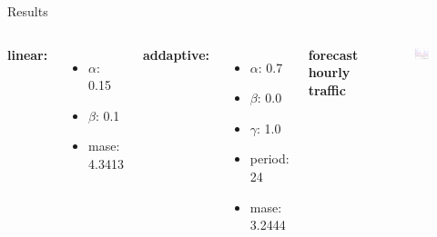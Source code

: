 \documentclass{beamer}
\begin{document}
  \begin{frame}{Results}
    \begin{columns}[c]
      \textbf{linear:}
      \begin{itemize}
	\item $\alpha$: 0.15
	\item $\beta$: 0.1
	\item mase: 4.3413
      \end{itemize}
      
      \textbf{addaptive:}
      \begin{itemize}
	\item $\alpha$: 0.7 
	\item $\beta$: 0.0
	\item $\gamma$: 1.0
	\item period: 24
	\item mase: 3.2444
      \end{itemize}
    
      \textbf{forecast hourly traffic}
      \begin{figure}
	\includegraphics[width=1.1\textwidth]{images/hoursly.png}
      \end{figure}
    \end{columns}
  \end{frame}
  
\end{document}
